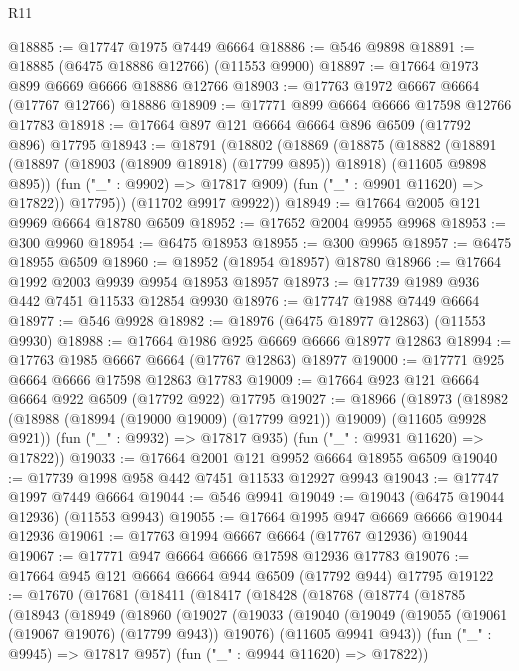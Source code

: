 \begin{lexlean}{R11}
\begin{coremodule}
@18885 := @17747 @1975 @7449 @6664
@18886 := @546 @9898
@18891 := @18885 (@6475 @18886 @12766) (@11553 @9900)
@18897 := @17664 @1973 @899 @6669 @6666 @18886 @12766
@18903 := @17763 @1972 @6667 @6664 (@17767 @12766) @18886
@18909 := @17771 @899 @6664 @6666 @17598 @12766 @17783
@18918 := @17664 @897 @121 @6664 @6664 @896 @6509 (@17792 @896) @17795
@18943 := @18791
    (@18802
      (@18869
        (@18875
          (@18882
            (@18891 (@18897 (@18903 (@18909 @18918) (@17799 @895)) @18918) (@11605 @9898 @895))
            (fun ("_" : @9902) => @17817 @909)
            (fun ("_" : @9901 @11620) => @17822))
          @17795))
      (@11702 @9917 @9922))
@18949 := @17664 @2005 @121 @9969 @6664 @18780 @6509
@18952 := @17652 @2004 @9955 @9968
@18953 := @300 @9960
@18954 := @6475 @18953
@18955 := @300 @9965
@18957 := @6475 @18955 @6509
@18960 := @18952 (@18954 @18957) @18780
@18966 := @17664 @1992 @2003 @9939 @9954 @18953 @18957
@18973 := @17739 @1989 @936 @442 @7451 @11533 @12854 @9930
@18976 := @17747 @1988 @7449 @6664
@18977 := @546 @9928
@18982 := @18976 (@6475 @18977 @12863) (@11553 @9930)
@18988 := @17664 @1986 @925 @6669 @6666 @18977 @12863
@18994 := @17763 @1985 @6667 @6664 (@17767 @12863) @18977
@19000 := @17771 @925 @6664 @6666 @17598 @12863 @17783
@19009 := @17664 @923 @121 @6664 @6664 @922 @6509 (@17792 @922) @17795
@19027 := @18966
    (@18973
      (@18982 (@18988 (@18994 (@19000 @19009) (@17799 @921)) @19009) (@11605 @9928 @921))
      (fun ("_" : @9932) => @17817 @935)
      (fun ("_" : @9931 @11620) => @17822))
@19033 := @17664 @2001 @121 @9952 @6664 @18955 @6509
@19040 := @17739 @1998 @958 @442 @7451 @11533 @12927 @9943
@19043 := @17747 @1997 @7449 @6664
@19044 := @546 @9941
@19049 := @19043 (@6475 @19044 @12936) (@11553 @9943)
@19055 := @17664 @1995 @947 @6669 @6666 @19044 @12936
@19061 := @17763 @1994 @6667 @6664 (@17767 @12936) @19044
@19067 := @17771 @947 @6664 @6666 @17598 @12936 @17783
@19076 := @17664 @945 @121 @6664 @6664 @944 @6509 (@17792 @944) @17795
@19122 := @17670
    (@17681
      (@18411
        (@18417
          (@18428
            (@18768
              (@18774
                (@18785
                  (@18943
                    (@18949
                      (@18960
                        (@19027
                          (@19033
                            (@19040
                              (@19049
                                (@19055 (@19061 (@19067 @19076) (@17799 @943)) @19076)
                                (@11605 @9941 @943))
                              (fun ("_" : @9945) => @17817 @957)
                              (fun ("_" : @9944 @11620) => @17822))

\end{coremodule}
\end{lexlean}
